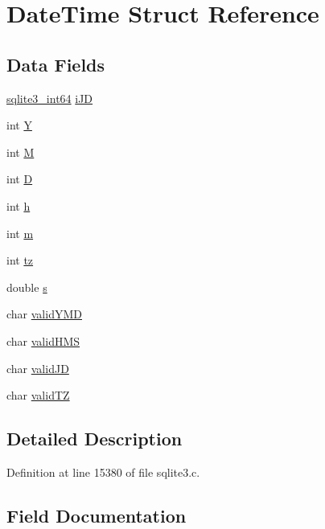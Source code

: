 \hypertarget{struct_date_time}{}\section{Date\+Time Struct Reference}
\label{struct_date_time}
\subsection*{Data Fields}
\begin{DoxyCompactItemize}
\item 
\hyperlink{sqlite3_8c_a0a4d3e6c1ad46f90e746b920ab6ca0d2}{sqlite3\+\_\+int64} \hyperlink{struct_date_time_aeefbd0fbabdd6a69ad04b1a9e198f53e}{i\+J\+D}
\item 
int \hyperlink{struct_date_time_aa482c4cc86a24474e4fb19b5b5978778}{Y}
\item 
int \hyperlink{struct_date_time_a5e78dbd5fd0fc01ba7b98dd15e27221e}{M}
\item 
int \hyperlink{struct_date_time_abf6d0ccec2f5157184071729f129de19}{D}
\item 
int \hyperlink{struct_date_time_a16611451551e3d15916bae723c3f59f7}{h}
\item 
int \hyperlink{struct_date_time_a742204794ea328ba293fe59cec79b990}{m}
\item 
int \hyperlink{struct_date_time_a5c28a2389e07dda8a40b2d5510541719}{tz}
\item 
double \hyperlink{struct_date_time_ad62e712560f6344b96d4c080a2ba9c92}{s}
\item 
char \hyperlink{struct_date_time_a3ecbd19a3a69417f900bb897e848f86d}{valid\+Y\+M\+D}
\item 
char \hyperlink{struct_date_time_a68511d770b1afeac58600ae09425c5a9}{valid\+H\+M\+S}
\item 
char \hyperlink{struct_date_time_a5953eb07d3a0d4d2b6d32143ad689c4b}{valid\+J\+D}
\item 
char \hyperlink{struct_date_time_a404804a749be5d0bff9dd31a0105ca2f}{valid\+T\+Z}
\end{DoxyCompactItemize}


\subsection{Detailed Description}


Definition at line 15380 of file sqlite3.\+c.



\subsection{Field Documentation}
\hypertarget{struct_date_time_abf6d0ccec2f5157184071729f129de19}{}
